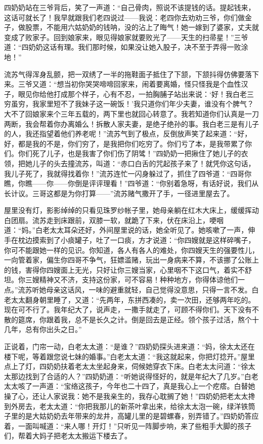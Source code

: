 \par 四奶奶站在三爷背后，笑了一声道：“自己骨肉，照说不该提钱的话。提起钱来，这话可就长了！我早就跟我们老四说过——我说：老四你去劝劝三爷，你们做金子，做股票，不能用六姑奶奶的钱呐，没的沾上了晦气！她一嫁到了婆家，丈夫就变成了败家子。回到娘家来，眼见得娘家就要败光了——天生的扫帚星！”三爷道：“四奶奶这话有理。我们那时候，如果没让她入股子，决不至于弄得一败涂地！”
\par 流苏气得浑身乱颤，把一双绣了一半的拖鞋面子抵住了下颔，下颔抖得仿佛要落下来。三爷又道：“想当初你哭哭啼啼回家来，闹着要离婚，怪只怪我是个血性汉子，眼见你给他打成那个样子，心有不忍，一拍胸脯子站出来说：‘好！我白老三穷虽穷，我家里短不了我妹子这一碗饭！’我只道你们年少夫妻，谁没有个脾气？大不了回娘家来个三年五载的，两下里也就回心转意了。我若知道你们认真是一刀两断，我会帮着你办离婚么！拆散人家夫妻，是绝子绝孙的事。我白老三是有儿子的人，我还指望着他们养老呢！”流苏气到了极点，反倒放声笑了起来道：“好，好，都是我的不是，你们穷了，是我把你们吃穷了。你们亏了本，是我带累了你们。你们死了儿子，也是我害了你们伤了阴骘！”四奶奶一把揪住了她儿子的衣领，把她儿子的头去撞流苏，叫道：“赤口白舌的咒起孩子来了！就凭你这句话，我儿子死了，我就得找着你！”流苏连忙一闪身躲过了，抓住了四爷道：“四哥你瞧，你瞧——你——你倒是评评理看！”四爷道：“你别着急呀，有话好说，我们从长计议。三哥这都是为你打算——”流苏赌气撒开了手，一径进里屋去了。
\par 屋里没有灯，影影绰绰的只看见珠罗纱帐子里，她母亲躺在红木大床上，缓缓挥动白团扇。流苏走到床跟前，双膝一软，就跪了下来，伏在床沿上，哽咽道：“妈。”白老太太耳朵还好，外间屋里说的话，她全听见了。她咳嗽了一声，伸手在枕边摸索到了小痰罐子，吐了一口痰，方才说道：“你四嫂就是这样碎嘴子，你可不能跟她一样的见识。你知道，各人有各人的难处，你四嫂天生的强要性儿，一向管着家，偏生你四哥不争气，狂嫖滥赌，玩出一身病来不算，不该挪了公账上的钱，害得你四嫂面上无光，只好让你三嫂当家，心里咽不下这口气，着实不舒坦。你三嫂精神又不济，支持这份家，可不容易！种种地方，你得体谅他们一点。”流苏听她母亲这话风，一味的避重就轻，自己觉得没意思，只得一言不发。白老太太翻身朝里睡了，又道：“先两年，东拼西凑的，卖一次田，还够两年吃的。现在可不行了。我年纪大了，说声走，一撒手就走了，可顾不得你们。天下没有不散的筵席，你跟着我，总不是长久之计。倒是回去是正经。领个孩子过活，熬个十几年，总有你出头之日。”
\par 正说着，门帘一动，白老太太道：“是谁？”四奶奶探头进来道：“妈，徐太太还在楼下呢，等着跟您说七妹的婚事。”白老太太道：“我这就起来，你把灯捻开。”屋里点上了灯，四奶奶扶着老太太坐起身来，伺候她穿衣下床。白老太太问道：“徐太太那边找到了合适的人？”四奶奶道：“听她说得怪好的，就是年纪大了几岁。”白老太太咳了一声道：“宝络这孩子，今年也二十四了，真是我心上一个疙瘩。白替她操了心，还让人家说我：她不是我亲生的，我存心耽搁了她！”四奶奶把老太太搀到外房去，老太太道：“你把我那儿的新茶叶拿出来，给徐太太泡一碗，绿洋铁筒子里的是大姑奶奶去年带来的龙井，高罐儿里的是碧螺春，别弄错了。”四奶奶答应着，一面叫喊道：“来人哪！开灯！”只听见一阵脚步响，来了些粗手大脚的孩子们，帮着大妈子把老太太搬运下楼去了。
